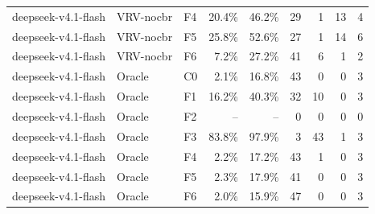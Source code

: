 \begin{tabular}{lllrrrrrr}
deepseek-v4.1-flash & VRV-nocbr & F4 & 20.4\% & 46.2\% & 29 & 1 & 13 & 4 \\
deepseek-v4.1-flash & VRV-nocbr & F5 & 25.8\% & 52.6\% & 27 & 1 & 14 & 6 \\
deepseek-v4.1-flash & VRV-nocbr & F6 & 7.2\% & 27.2\% & 41 & 6 & 1 & 2 \\
deepseek-v4.1-flash & Oracle & C0 & 2.1\% & 16.8\% & 43 & 0 & 0 & 3 \\
deepseek-v4.1-flash & Oracle & F1 & 16.2\% & 40.3\% & 32 & 10 & 0 & 3 \\
deepseek-v4.1-flash & Oracle & F2 & -- & -- & 0 & 0 & 0 & 0 \\
deepseek-v4.1-flash & Oracle & F3 & 83.8\% & 97.9\% & 3 & 43 & 1 & 3 \\
deepseek-v4.1-flash & Oracle & F4 & 2.2\% & 17.2\% & 43 & 1 & 0 & 3 \\
deepseek-v4.1-flash & Oracle & F5 & 2.3\% & 17.9\% & 41 & 0 & 0 & 3 \\
deepseek-v4.1-flash & Oracle & F6 & 2.0\% & 15.9\% & 47 & 0 & 0 & 3 \\
\bottomrule
\end{tabular}

